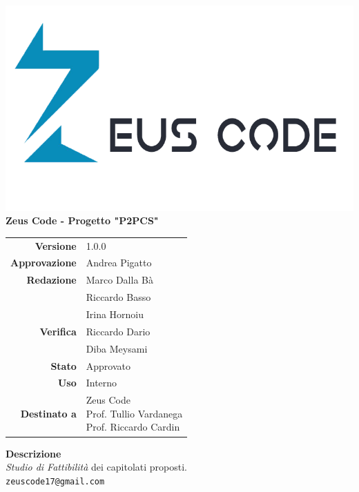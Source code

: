 \thispagestyle{empty}
\begin{titlepage}
	\begin{center}
		\includegraphics[scale = 0.3]{res/images/zeus_code_logo.png}\\
		\large \textbf{Zeus Code - Progetto "P2PCS"} \\
		\vfill
		\Huge \textbf{\doctitle}
		\vspace*{\fill}
		
		\vfill
		\large
		\begin{tabular}{r|l}
			\textbf{Versione} & 1.0.0 \\
			\textbf{Approvazione} & Andrea Pigatto \\
			\textbf{Redazione} &    Marco Dalla Bà \\ &
			Riccardo Basso\\&
			Irina Hornoiu\\                        	                        		\textbf{Verifica} &  Riccardo Dario\\&
			Diba Meysami \\
			\textbf{Stato} & Approvato \\
			\textbf{Uso} & Interno \\
			\textbf{Destinato a} & \parbox[t]{5cm}{Zeus Code
				\\Prof. Tullio Vardanega\\Prof. Riccardo Cardin}
		\end{tabular}
		\vfill
		\normalsize
		\textbf{Descrizione}\\
		\textit{Studio di Fattibilità} dei capitolati proposti.\\
		\vfill
		\small
		\texttt{zeuscode17@gmail.com}
	\end{center}
\end{titlepage}